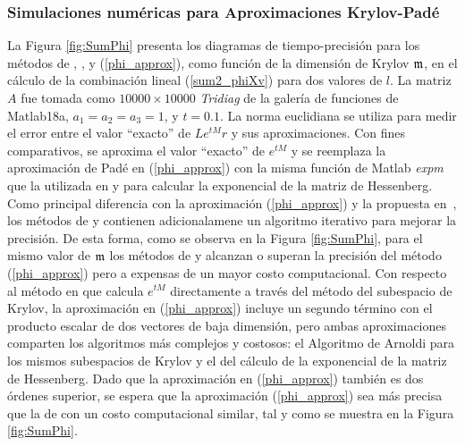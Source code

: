 \subsubsection{Simulaciones numéricas para Aproximaciones Krylov-Padé}
La Figura \ref{fig:SumPhi} presenta los diagramas de tiempo-precisión para los métodos de \cite{hochbruck1997krylov}, \cite{sidje1998expokit}, \cite{niesen2012algorithm} y (\ref{phi_approx}), como función de la dimensión de Krylov $\mathfrak{m}$, en el cálculo de la combinación lineal (\ref{sum2_phiXv}) para dos valores de $l$. La matriz $A$ fue tomada como $10000 \times 10000$ \textit{Tridiag} de la galería de funciones de Matlab18a, $a_1=a_2=a_3=1$, y $t=0.1$. La norma euclidiana se utiliza para medir el error entre el valor ``exacto'' de $L e^{t M}r$ y sus aproximaciones. Con fines comparativos, se aproxima el valor ``exacto'' de $e^{t M}$ y se reemplaza la aproximación de Padé en (\ref{phi_approx}) con la misma función de Matlab \textit{expm} que la utilizada en \cite{sidje1998expokit} y \cite{niesen2012algorithm} para calcular la exponencial de la matriz de Hessenberg. Como principal diferencia con la aproximación (\ref{phi_approx}) y la propuesta en~\cite{hochbruck1997krylov}, los métodos de \cite{sidje1998expokit} y \cite{niesen2012algorithm} contienen adicionalamene un algoritmo iterativo para mejorar la precisión. De esta forma, como se observa en la Figura \ref{fig:SumPhi}, para el mismo valor de $\mathfrak{m}$ los métodos de \cite{sidje1998expokit} y \cite{niesen2012algorithm} alcanzan o superan la precisión del método (\ref{phi_approx}) pero a expensas de un mayor costo computacional. Con respecto al método en \cite{hochbruck1997krylov} que calcula $e^{t M}$ directamente a través del método del subespacio de Krylov, la aproximación en (\ref{phi_approx}) incluye un segundo término con el producto escalar de dos vectores de baja dimensión, pero ambas aproximaciones comparten los  algoritmos más complejos y costosos: el Algoritmo de Arnoldi para los mismos subespacios de Krylov y el del cálculo de la exponencial de la  matriz de Hessenberg. Dado que la aproximación en (\ref{phi_approx}) también es dos órdenes superior, se espera que la aproximación (\ref{phi_approx}) sea más precisa que la de \cite{hochbruck1997krylov} con un costo computacional similar, tal y como se muestra en la Figura \ref{fig:SumPhi}.

